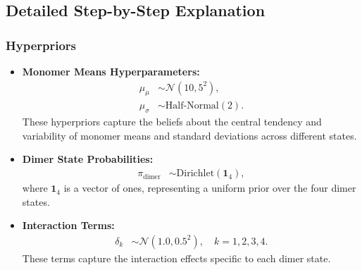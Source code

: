 \documentclass[12pt]{article}
\begin{document}
\subsection{Detailed Step-by-Step Explanation}

\subsubsection{Hyperpriors}
\begin{itemize}
    \item \textbf{Monomer Means Hyperparameters:}
    \begin{align}
        \mu_{\mu} &\sim \mathcal{N}(10, 5^2), \\
        \mu_{\sigma} &\sim \text{Half-Normal}(2).
    \end{align}
    These hyperpriors capture the beliefs about the central tendency and variability of monomer means and standard deviations across different states.
    
    \item \textbf{Dimer State Probabilities:}
    \begin{align}
        \pi_{\text{dimer}} &\sim \text{Dirichlet}(\bm{1}_4),
    \end{align}
    where \(\bm{1}_4\) is a vector of ones, representing a uniform prior over the four dimer states.
    
    \item \textbf{Interaction Terms:}
    \begin{align}
        \delta_k &\sim \mathcal{N}(1.0, 0.5^2), \quad k = 1, 2, 3, 4.
    \end{align}
    These terms capture the interaction effects specific to each dimer state.
\end{itemize}
\end{document}
